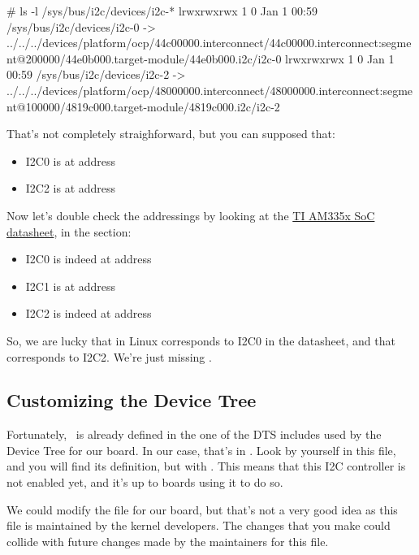 {\begin{bashinput}
# ls -l /sys/bus/i2c/devices/i2c-*
lrwxrwxrwx    1         0 Jan  1 00:59 /sys/bus/i2c/devices/i2c-0 -> ../../../devices/platform/ocp/44c00000.interconnect/44c00000.interconnect:segment@200000/44e0b000.target-module/44e0b000.i2c/i2c-0
lrwxrwxrwx    1         0 Jan  1 00:59 /sys/bus/i2c/devices/i2c-2 -> ../../../devices/platform/ocp/48000000.interconnect/48000000.interconnect:segment@100000/4819c000.target-module/4819c000.i2c/i2c-2
\end{bashinput}

That's not completely straighforward, but you can supposed that:
\begin{itemize}
\item I2C0 is at address 
\item I2C2 is at address 
\end{itemize}

Now let's double check the addressings by looking at the
\href{https://www.ti.com/lit/ug/spruh73q/spruh73q.pdf}{TI AM335x SoC
datasheet}, in the  section:

\begin{itemize}
\item I2C0 is indeed at address 
\item I2C1 is at address 
\item I2C2 is indeed at address 
\end{itemize}

So, we are lucky that  in Linux corresponds to I2C0 in the
datasheet, and that  corresponds to I2C2.
We're just missing .

\subsection{Customizing the Device Tree}

Fortunately, \busname\ is already defined in the one of the DTS includes
used by the Device Tree for our board. In our case, that's in
. Look by yourself in this
file, and you will find its definition, but with . This means that this I2C controller is not enabled yet,
and it's up to boards using it to do so.

We could modify the  file
for our board, but that's not a very good idea as this file is
maintained by the kernel developers. The changes that you make could
collide with future changes made by the maintainers for this file.

}
